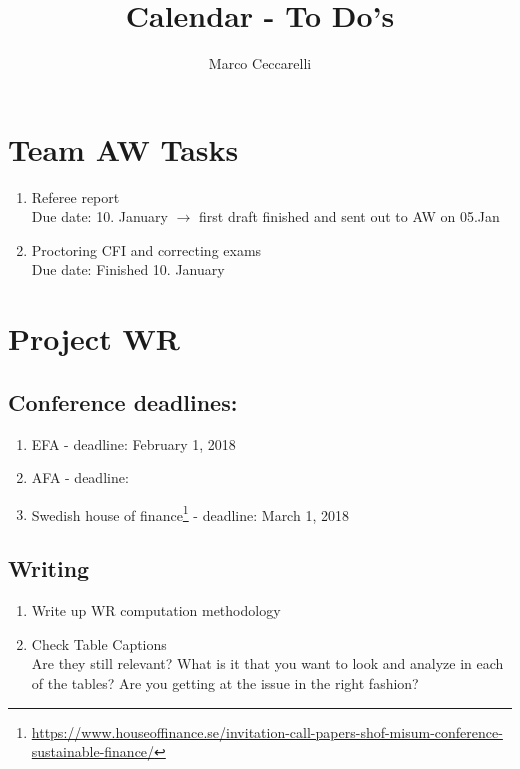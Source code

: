 \documentclass[11pt,a4paper,paranthesis]{article}
\author{Marco Ceccarelli}
\title{ \large Calendar - To Do's}
\begin{document}
	\maketitle
\section{Team AW Tasks}
\begin{enumerate} [leftmargin=*]
	\item Referee report \\ 
	Due date: 10. January $\rightarrow$ first draft finished and sent out to AW on 05.Jan
	\item Proctoring CFI and correcting exams \\
	Due date: Finished 10. January
\end{enumerate}

\section{Project WR}
\subsection{Conference deadlines:}
\begin{enumerate}[leftmargin=1cm]
	\item EFA - deadline: February 1, 2018
	\item AFA - deadline:
	\item Swedish house of finance\footnote{\url{https://www.houseoffinance.se/invitation-call-papers-shof-misum-conference-sustainable-finance/}} - deadline: March 1, 2018
\end{enumerate}
\subsection{Writing}
\begin{enumerate} [leftmargin=*]
	\item Write up WR computation methodology
	\item Check Table Captions \\ Are they still relevant? What is it that you want to look and analyze in each of the tables? Are you getting at the issue in the right fashion?
\end{enumerate}
\end{document}
